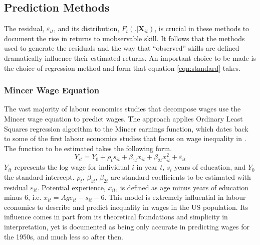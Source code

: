 \documentclass[notitlepage,12pt]{article}
\newcommand{\1}[1]{\ensuremath{\mathbb{1}\left( #1 \right)}}               %
\begin{document}
\subsection{Prediction Methods}
The residual, $\varepsilon_{it}$, and its distribution, $F_t(.| \mathbf{X}_{it})$, is crucial in these methods to document the rise in returns to unobservable skill.  It follows that the methods used to generate the residuals and the way that ``observed'' skills are defined dramatically influence their estimated returns.
An important choice to be made is the choice of regression method and form that equation \eqref{eqn:standard} takes.

\subsubsection{Mincer Wage Equation}
The vast majority of labour economics studies that decompose wages use the Mincer wage equation to predict wages.  The approach applies Ordinary Least Squares regression algorithm to the Mincer earnings function, which dates back to some of the first labour economics studies that focus on wage inequality in \cite{mincer1958investment, mincer1974schooling}.  The function to be estimated takes the following form.
\begin{equation}
Y_{it}  = Y_0 + \rho_t s_{it} +\beta_{1t} x_{it} + \beta_{2t} x_{it}^2 + \varepsilon_{it}
\end{equation}
$Y_{it}$ represents the log wage for individual $i$ in year $t$, $s_i$ years of education, and $Y_0$ the standard intercept.  $\rho_t$, $\beta_{1t}$, $\beta_{2t}$ are standard coefficients to be estimated with residual $\varepsilon_{it}$.  Potential experience, $x_{it}$, is defined as age minus years of education minus 6, i.e. $x_{it} = Age_{it} - s_{it} - 6$.  This model is extremely influential in labour economics to describe and predict inequality in wages in the US population.  Its influence comes in part from its theoretical foundations and simplicity in interpretation, yet is documented as being only accurate in predicting wages for the 1950s, and much less so after then. 
\end{document}
